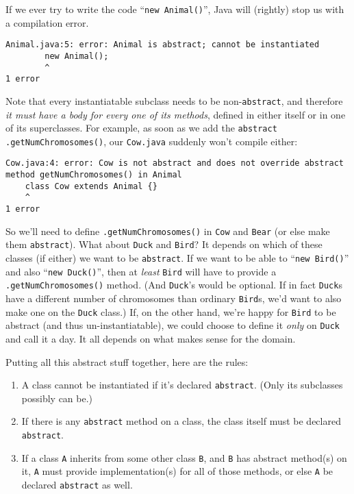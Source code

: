 If we ever try to write the code ``\texttt{new Animal()}'', Java will (rightly)
stop us with a compilation error.

\begin{Verbatim}[fontsize=\small,samepage=true]
Animal.java:5: error: Animal is abstract; cannot be instantiated
        new Animal();
        ^
1 error
\end{Verbatim}

\begin{samepage} Note that every instantiatable subclass needs to be
non-\texttt{abstract}, and therefore \textit{it must have a body for every one
of its methods}, defined in either itself or in one of its superclasses. For
example, as soon as we add the \texttt{abstract}
\texttt{.getNumChromosomes()}, our \texttt{Cow.java} suddenly won't compile
either:

\begin{Verbatim}[fontsize=\small,samepage=true]
Cow.java:4: error: Cow is not abstract and does not override abstract
method getNumChromosomes() in Animal
    class Cow extends Animal {}
    ^
1 error
\end{Verbatim}
\normalsize
\end{samepage}

So we'll need to define \texttt{.getNumChromosomes()} in \texttt{Cow} and
\texttt{Bear} (or else make them \texttt{abstract}). What about \texttt{Duck}
and \texttt{Bird}? It depends on which of these classes (if either) we want to
be \texttt{abstract}. If we want to be able to ``\texttt{new Bird()}'' and also
``\texttt{new Duck()}'', then at \textit{least} \texttt{Bird} will have to
provide a \texttt{.getNumChromosomes()} method. (And \texttt{Duck}'s would be
optional. If in fact \texttt{Duck}s have a different number of chromosomes
than ordinary \texttt{Bird}s, we'd want to also make one on the \texttt{Duck}
class.) If, on the other hand, we're happy for \texttt{Bird} to be abstract
(and thus un-instantiatable), we could choose to define it \textit{only} on
\texttt{Duck} and call it a day. It all depends on what makes sense for the
domain.

Putting all this abstract stuff together, here are the rules:

\begin{enumerate}
\itemsep.1em
\item A class cannot be instantiated if it's declared \texttt{abstract}. (Only
its subclasses possibly can be.)
\item If there is any \texttt{abstract} method on a class, the class itself
must be declared \texttt{abstract}.
\item If a class \texttt{A} inherits from some other class \texttt{B}, and
\texttt{B} has abstract method(s) on it, \texttt{A} must provide
implementation(s) for all of those methods, or else \texttt{A} be declared 
\texttt{abstract} as well.
\end{enumerate}

